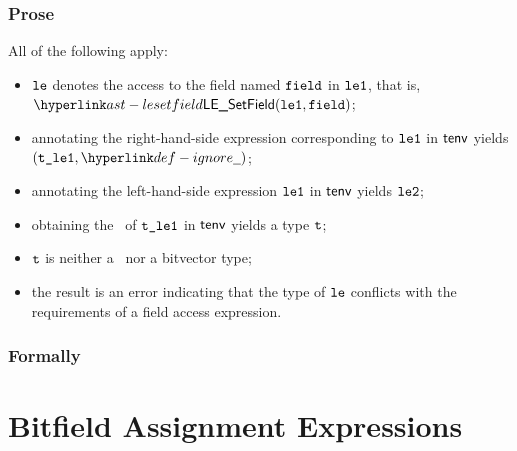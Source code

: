 \subsubsection{Prose}
All of the following apply:
\begin{itemize}
  \item $\vle$ denotes the access to the field named $\field$ in $\vleone$, that is, \\ $\LESetField(\vleone, \field)$;
  \item annotating the right-hand-side expression corresponding to $\vleone$ in $\tenv$ yields \\ $(\vtleone, \Ignore)$\ProseOrTypeError;
  \item annotating the left-hand-side expression $\vleone$ in $\tenv$ yields $\vletwo$\ProseOrTypeError;
  \item obtaining the \structure\ of $\vtleone$ in $\tenv$ yields a type $\vt$\ProseOrTypeError;
  \item $\vt$ is neither a \structuredtype\ nor a bitvector type;
  \item the result is an error indicating that the type of $\vle$ conflicts with the requirements of a field access expression.
\end{itemize}
\subsubsection{Formally}
\begin{mathpar}
\end{mathpar}

\section{Bitfield Assignment Expressions\label{sec:BitfieldAssignmentExpressions}}
